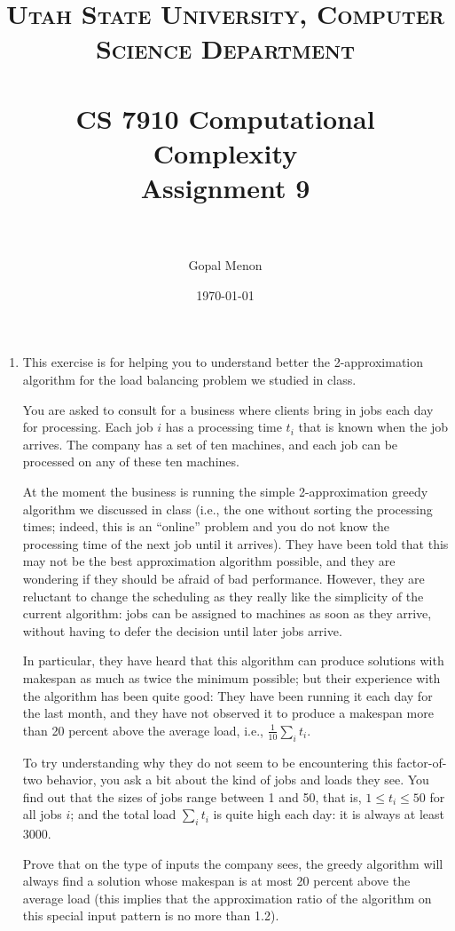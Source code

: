 \documentclass[paper=a4, fontsize=11pt]{scrartcl} %
\title{	
\normalfont \normalsize 
\textsc{Utah State University, Computer Science Department} \\ [25pt] %
\horrule{0.5pt} \\[0.4cm] %
\huge CS 7910 Computational Complexity\\Assignment 9 \\ %
\horrule{2pt} \\[0.5cm] %
}
\author{Gopal Menon} %
\date{\normalsize\today} %
\numberwithin{figure}{section} %
\numberwithin{table}{section} %
\begin{document}
\maketitle %

\begin{enumerate}
\item This exercise is for helping you to understand better the 2-approximation algorithm for the load balancing problem we studied in class.

You are asked to consult for a business where clients bring in jobs each day for processing. Each job $i$ has a processing time $t_i$ that is known when the job arrives. The company has a set of ten machines, and each job can be processed on any of these ten machines.

At the moment the business is running the simple 2-approximation greedy algorithm we discussed in class (i.e., the one without sorting the processing times; indeed, this is an \enquote{online} problem and you do not know the processing time of the next job until it arrives). They have been told that this may not be the best approximation algorithm possible, and they are wondering if they should be afraid of bad performance. However, they are reluctant to change the scheduling as they really like the simplicity of the current algorithm: jobs can be assigned to machines as soon as they arrive, without having to defer the decision until later jobs arrive.

In particular, they have heard that this algorithm can produce solutions with makespan as much as twice the minimum possible; but their experience with the algorithm has been quite good: They have been running it each day for the last month, and they have not observed it to produce a makespan more than 20 percent above the average load, i.e., $\frac{1}{10} \sum_i t_i$.

To try understanding why they do not seem to be encountering this factor-of-two behavior, you ask a bit about the kind of jobs and loads they see. You find out that the sizes of jobs range between 1 and 50, that is, $1 \leq t_i \leq 50$ for all jobs $i$; and the total load $\sum_i t_i$ is quite high each day: it is always at least 3000.

Prove that on the type of inputs the company sees, the greedy algorithm will always find a solution whose makespan is at most 20 percent above the average load (this implies that the approximation ratio of the algorithm on this special input pattern is no more than 1.2).

\end{enumerate}

\end{document}
